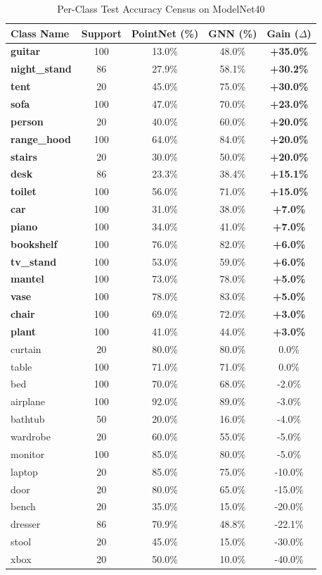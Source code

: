 \documentclass[conference]{IEEEtran}
\begin{document}
\begin{table}[htbp]
\caption{Per-Class Test Accuracy Census on ModelNet40}
\label{tab:per_class_census}
\centering
\scriptsize
\begin{tabular}{lcccc}
\toprule
\textbf{Class Name} & \textbf{Support} & \textbf{PointNet (\%)} & \textbf{GNN (\%)} & \textbf{Gain ($\Delta$)} \\
\midrule
\textbf{guitar} & 100 & 13.0\% & 48.0\% & \textbf{+35.0\%} \\
\textbf{night\_stand} & 86 & 27.9\% & 58.1\% & \textbf{+30.2\%} \\
\textbf{tent} & 20 & 45.0\% & 75.0\% & \textbf{+30.0\%} \\
\textbf{sofa} & 100 & 47.0\% & 70.0\% & \textbf{+23.0\%} \\
\textbf{person} & 20 & 40.0\% & 60.0\% & \textbf{+20.0\%} \\
\textbf{range\_hood} & 100 & 64.0\% & 84.0\% & \textbf{+20.0\%} \\
\textbf{stairs} & 20 & 30.0\% & 50.0\% & \textbf{+20.0\%} \\
\textbf{desk} & 86 & 23.3\% & 38.4\% & \textbf{+15.1\%} \\
\textbf{toilet} & 100 & 56.0\% & 71.0\% & \textbf{+15.0\%} \\
\textbf{car} & 100 & 31.0\% & 38.0\% & \textbf{+7.0\%} \\
\textbf{piano} & 100 & 34.0\% & 41.0\% & \textbf{+7.0\%} \\
\textbf{bookshelf} & 100 & 76.0\% & 82.0\% & \textbf{+6.0\%} \\
\textbf{tv\_stand} & 100 & 53.0\% & 59.0\% & \textbf{+6.0\%} \\
\textbf{mantel} & 100 & 73.0\% & 78.0\% & \textbf{+5.0\%} \\
\textbf{vase} & 100 & 78.0\% & 83.0\% & \textbf{+5.0\%} \\
\textbf{chair} & 100 & 69.0\% & 72.0\% & \textbf{+3.0\%} \\
\textbf{plant} & 100 & 41.0\% & 44.0\% & \textbf{+3.0\%} \\
curtain & 20 & 80.0\% & 80.0\% & 0.0\% \\
table & 100 & 71.0\% & 71.0\% & 0.0\% \\
bed & 100 & 70.0\% & 68.0\% & -2.0\% \\
airplane & 100 & 92.0\% & 89.0\% & -3.0\% \\
bathtub & 50 & 20.0\% & 16.0\% & -4.0\% \\
wardrobe & 20 & 60.0\% & 55.0\% & -5.0\% \\
monitor & 100 & 85.0\% & 80.0\% & -5.0\% \\
laptop & 20 & 85.0\% & 75.0\% & -10.0\% \\
door & 20 & 80.0\% & 65.0\% & -15.0\% \\
bench & 20 & 35.0\% & 15.0\% & -20.0\% \\
dresser & 86 & 70.9\% & 48.8\% & -22.1\% \\
stool & 20 & 45.0\% & 15.0\% & -30.0\% \\
xbox & 20 & 50.0\% & 10.0\% & -40.0\% \\
\bottomrule
\end{tabular}
\end{table}
\end{document}

